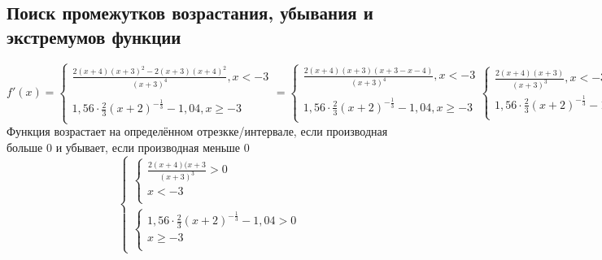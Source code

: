 \documentclass{article}
\begin{document}
    \subsection{Поиск промежутков возрастания, убывания и экстремумов функции}
    \begin{equation*}
    f'(x) = 
    \begin{cases}
        \frac{2(x+4)(x+3)^2 - 2(x+3)(x+4)^2}{(x+3)^4}, x < -3 \\ \\ 
        1,56 \cdot \frac{2}{3}(x+2)^{-\frac{1}{3}} - 1,04, x \geq -3 \\
    \end{cases}
    =
    \begin{cases}
        \frac{2(x+4)(x+3)(x+3-x-4)}{(x+3)^4}, x < -3 \\ \\ 
        1,56 \cdot \frac{2}{3}(x+2)^{-\frac{1}{3}} - 1,04, x \geq -3 \\
    \end{cases}
    \begin{cases}
        \frac{2(x+4)(x+3)}{(x+3)^3}, x < -3 \\
        1,56 \cdot \frac{2}{3}(x+2)^{-\frac{1}{3}} - 1,04, x \geq -3 \\
    \end{cases}
    \end{equation*}
    Функция возрастает на определённом отрезкке/интервале, если производная больше 0 и убывает, если производная меньше 0
    \begin{equation*}
    \begin{cases}    
        \begin{cases}
            \frac{2(x+4)(x+3}{(x+3)^3} > 0 \\
            x < -3 \\
        \end{cases} \\
        \begin{cases}
            1,56 \cdot \frac{2}{3}(x+2)^{-\frac{1}{3}} - 1,04 > 0 \\
            x \geq -3 \\
        \end{cases}
    \end{cases}
    \end{equation*}
\end{document}
